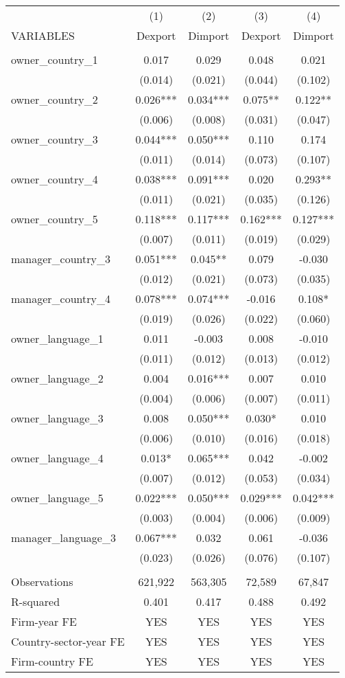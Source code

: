 \begin{tabular}{lcccc} \hline
 & (1) & (2) & (3) & (4) \\
VARIABLES & Dexport & Dimport & Dexport & Dimport \\ \hline
 &  &  &  &  \\
owner\_country\_1 & 0.017 & 0.029 & 0.048 & 0.021 \\
 & (0.014) & (0.021) & (0.044) & (0.102) \\
owner\_country\_2 & 0.026*** & 0.034*** & 0.075** & 0.122** \\
 & (0.006) & (0.008) & (0.031) & (0.047) \\
owner\_country\_3 & 0.044*** & 0.050*** & 0.110 & 0.174 \\
 & (0.011) & (0.014) & (0.073) & (0.107) \\
owner\_country\_4 & 0.038*** & 0.091*** & 0.020 & 0.293** \\
 & (0.011) & (0.021) & (0.035) & (0.126) \\
owner\_country\_5 & 0.118*** & 0.117*** & 0.162*** & 0.127*** \\
 & (0.007) & (0.011) & (0.019) & (0.029) \\
manager\_country\_3 & 0.051*** & 0.045** & 0.079 & -0.030 \\
 & (0.012) & (0.021) & (0.073) & (0.035) \\
manager\_country\_4 & 0.078*** & 0.074*** & -0.016 & 0.108* \\
 & (0.019) & (0.026) & (0.022) & (0.060) \\
owner\_language\_1 & 0.011 & -0.003 & 0.008 & -0.010 \\
 & (0.011) & (0.012) & (0.013) & (0.012) \\
owner\_language\_2 & 0.004 & 0.016*** & 0.007 & 0.010 \\
 & (0.004) & (0.006) & (0.007) & (0.011) \\
owner\_language\_3 & 0.008 & 0.050*** & 0.030* & 0.010 \\
 & (0.006) & (0.010) & (0.016) & (0.018) \\
owner\_language\_4 & 0.013* & 0.065*** & 0.042 & -0.002 \\
 & (0.007) & (0.012) & (0.053) & (0.034) \\
owner\_language\_5 & 0.022*** & 0.050*** & 0.029*** & 0.042*** \\
 & (0.003) & (0.004) & (0.006) & (0.009) \\
manager\_language\_3 & 0.067*** & 0.032 & 0.061 & -0.036 \\
 & (0.023) & (0.026) & (0.076) & (0.107) \\
 &  &  &  &  \\
Observations & 621,922 & 563,305 & 72,589 & 67,847 \\
R-squared & 0.401 & 0.417 & 0.488 & 0.492 \\
Firm-year FE & YES & YES & YES & YES \\
Country-sector-year FE & YES & YES & YES & YES \\
 Firm-country FE & YES & YES & YES & YES \\ \hline
\end{tabular}
